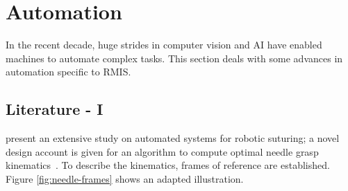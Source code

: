 \documentclass[english]{sobraep}
\begin{document}
\section{Automation}\label{sec:Automation}
\par{In the recent decade, huge strides in computer vision and AI have enabled machines to automate complex tasks. %
This section deals with some advances in automation specific to RMIS.}
\subsection{Literature - I}
\par{\citeauthor{needle-grasp} present an extensive study on automated systems for robotic suturing; a novel design account is given for an algorithm to compute optimal needle grasp kinematics~\cite{needle-grasp}. To describe the kinematics, frames of reference are established. Figure \ref{fig:needle-frames} shows an adapted illustration.} 
\end{document}
